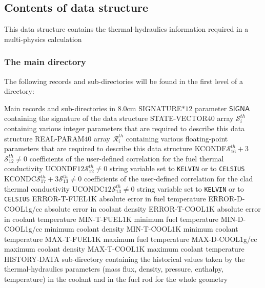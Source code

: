\subsection{Contents of  data structure}\label{sect:thmdir}

This data structure contains the thermal-hydraulics information required in a multi-physics calculation

\subsubsection{The main  directory}\label{sect:thmdirmain}

The following records and sub-directories will be found in the first level of a  directory:

\begin{DescriptionEnregistrement}{Main records and sub-directories in }{8.0cm}
\CharEnr
  {SIGNATURE}{$*12$}
  {parameter $\mathsf{SIGNA}$ containing the signature of the data structure}
\IntEnr
  {STATE-VECTOR}{$40$}
  {array $\mathcal{S}^{th}_{i}$ containing various integer parameters that are required to describe this data structure}
\RealEnr
  {REAL-PARAM}{$40$}{}
  {array $\mathcal{R}^{th}_{i}$ containing various floating-point parameters that are required to describe this data structure}
\OptRealEnr
  {KCONDF}{$\mathcal{S}^{th}_{16}+3$}{$\mathcal{S}^{th}_{12}\ne 0$}{}
  {coefficients of the user-defined correlation for the fuel thermal conductivity}
\OptCharEnr
  {UCONDF}{$12$}{$\mathcal{S}^{th}_{12}\ne 0$}
  {string variable set to {\tt KELVIN} or to {\tt CELSIUS}}
\OptRealEnr
  {KCONDC}{$\mathcal{S}^{th}_{17}+3$}{$\mathcal{S}^{th}_{13}\ne 0$}{}
  {coefficients of the user-defined correlation for the clad thermal conductivity}
\OptCharEnr
  {UCONDC}{$12$}{$\mathcal{S}^{th}_{13}\ne 0$}
  {string variable set to {\tt KELVIN} or to {\tt CELSIUS}}
\RealEnr
  {ERROR-T-FUEL}{1}{K}
  {absolute error in fuel temperature}
\RealEnr
  {ERROR-D-COOL}{1}{g/cc}
  {absolute error in coolant density}
\RealEnr
  {ERROR-T-COOL}{1}{K}
  {absolute error in coolant temperature}
\RealEnr
  {MIN-T-FUEL}{1}{K}
  {minimum fuel temperature}
\RealEnr
  {MIN-D-COOL}{1}{g/cc}
  {minimum coolant density}
\RealEnr
  {MIN-T-COOL}{1}{K}
  {minimum coolant temperature}
\RealEnr
  {MAX-T-FUEL}{1}{K}
  {maximum fuel temperature}
\RealEnr
  {MAX-D-COOL}{1}{g/cc}
  {maximum coolant density}
\RealEnr
  {MAX-T-COOL}{1}{K}
  {maximum coolant temperature}
 \DirEnr
  {HISTORY-DATA}
  {sub-directory containing the historical values taken by the thermal-hydraulics parameters (mass flux, density, pressure, enthalpy, temperature) in the coolant and in the fuel rod for the whole geometry}
\end{DescriptionEnregistrement}

